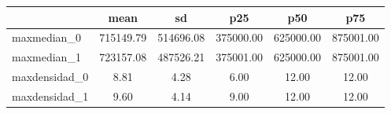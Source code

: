 {
\def\sym#1{\ifmmode^{#1}\else\(^{#1}\)\fi}
\begin{tabular}{l*{1}{ccccc}}
\toprule
                    &        mean&          sd&         p25&         p50&         p75\\
\midrule
maxmedian\_0         &   715149.79&   514696.08&   375000.00&   625000.00&   875001.00\\
maxmedian\_1         &   723157.08&   487526.21&   375001.00&   625000.00&   875001.00\\
maxdensidad\_0       &        8.81&        4.28&        6.00&       12.00&       12.00\\
maxdensidad\_1       &        9.60&        4.14&        9.00&       12.00&       12.00\\
\bottomrule
\end{tabular}
}
